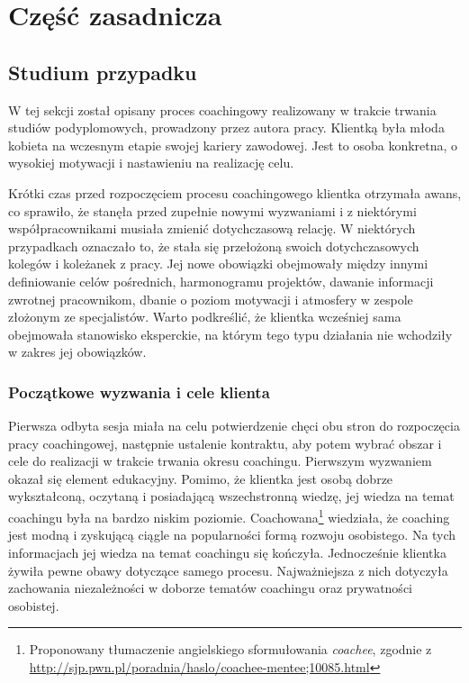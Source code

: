 
\chapter{Część zasadnicza}

\section{Studium przypadku}

W tej sekcji został opisany proces coachingowy realizowany w trakcie trwania studiów podyplomowych, prowadzony przez autora pracy. Klientką była
młoda kobieta na wczesnym etapie swojej kariery zawodowej. Jest to osoba konkretna, o wysokiej motywacji i nastawieniu na realizację celu.

Krótki czas przed rozpoczęciem procesu coachingowego klientka otrzymała awans, co sprawiło,
że stanęła przed zupełnie nowymi wyzwaniami i z niektórymi współpracownikami musiała zmienić dotychczasową relację. W niektórych przypadkach oznaczało
to, że stała się przełożoną swoich dotychczasowych kolegów i koleżanek z pracy. Jej nowe obowiązki obejmowały między innymi definiowanie celów pośrednich,
harmonogramu projektów, dawanie informacji zwrotnej pracownikom, dbanie o poziom motywacji i atmosfery w zespole złożonym ze specjalistów. Warto podkreślić,
że klientka wcześniej sama obejmowała stanowisko eksperckie, na którym tego typu działania nie wchodziły w zakres jej obowiązków.

\subsection{Początkowe wyzwania i cele klienta}

Pierwsza odbyta sesja miała na celu potwierdzenie chęci obu stron do rozpoczęcia pracy coachingowej, następnie ustalenie kontraktu, aby potem wybrać obszar
i cele do realizacji w trakcie trwania okresu coachingu. Pierwszym wyzwaniem okazał się element edukacyjny. Pomimo, że klientka jest osobą dobrze
wykształconą, oczytaną i posiadającą wszechstronną wiedzę, jej wiedza na temat coachingu była na bardzo niskim poziomie. Coachowana\footnote{Proponowany
tłumaczenie angielskiego sformułowania \emph{coachee}, zgodnie z \url{http://sjp.pwn.pl/poradnia/haslo/coachee-mentee;10085.html}} wiedziała, że coaching
jest modną i zyskującą ciągle na popularności formą rozwoju osobistego. Na tych informacjach jej wiedza na temat coachingu się kończyła. Jednocześnie
klientka żywiła pewne obawy dotyczące samego procesu. Najważniejsza z nich dotyczyła zachowania niezależności w doborze tematów coachingu oraz prywatności
osobistej.

